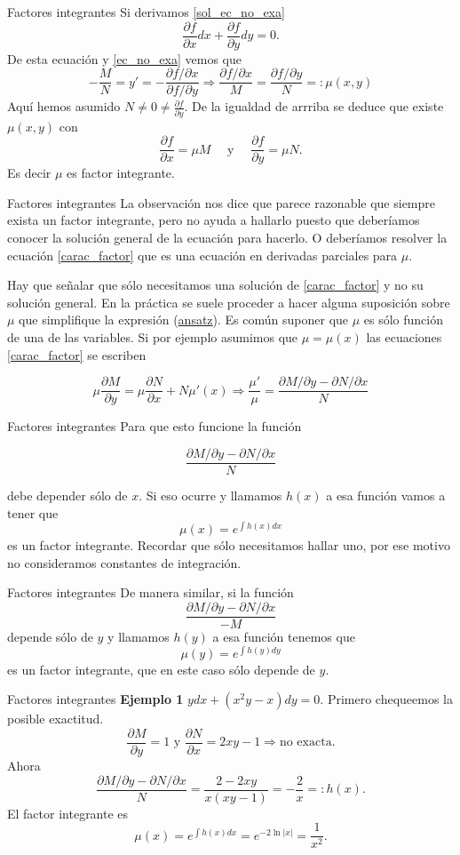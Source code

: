 \documentclass{article}
\renewcommand{\emph}[1]{\textcolor[rgb]{1,0,0}{#1}}
\newcommand{\der}[2]{\frac{\partial #1}{\partial #2}}
\begin{document}
 
 
 


{Factores integrantes}
Si derivamos \eqref{sol_ec_no_exa}
\[\der{f}{x}dx+\der{f}{y}dy=0.\]
De esta ecuación y \eqref{ec_no_exa} vemos que
\[-\frac{M}{N}=y'=-\frac{\partial f /\partial x}{\partial f/\partial y}\Longrightarrow \frac{ \partial f /\partial x}{M}=\frac{ \partial f/\partial y}{N}=:\mu(x,y)\]
Aquí hemos asumido $N\neq 0 \neq\der{f}{y}$. De la igualdad de arrriba se deduce que existe $\mu(x,y)$ con
\[\der{f}{x}=\mu M\quad\text{ y }\quad \der{f}{y}=\mu N.\]
Es decir $\mu$ es factor integrante.


{Factores integrantes}
La observación nos dice que parece razonable que siempre exista un factor integrante, pero no ayuda a hallarlo puesto que deberíamos conocer la solución general de la ecuación
para hacerlo. O deberíamos resolver la ecuación \eqref{carac_factor} que es una ecuación en derivadas parciales para $\mu$.

Hay que señalar que sólo necesitamos una solución de \eqref{carac_factor} y no su solución general. En la práctica se suele proceder a hacer alguna suposición
sobre $\mu$ que simplifique la expresión (\href{http://es.wikipedia.org/wiki/Ansatz}{ansatz}). Es común suponer que $\mu$ es sólo función de una de las variables. Si por ejemplo asumimos que $\mu=\mu(x)$ las ecuaciones 
\eqref{carac_factor} se escriben

\[\mu\der{M}{y}=\mu\der{N}{x}+N\mu'(x) \Longrightarrow\boxed{\frac{\mu'}{\mu}=\frac{\partial M/\partial y-\partial N/\partial x}{N}}\]



{Factores integrantes}
Para que esto funcione la función 

\[\frac{\partial M/\partial y-\partial N/\partial x}{N}\]

\emph{debe depender sólo de $x$}. Si eso ocurre y llamamos $h(x)$ a esa función vamos a tener que
\[\mu(x)=e^{\int h(x)dx}\]
es un factor integrante. Recordar que sólo necesitamos hallar uno, por ese motivo no consideramos constantes de integración. 


{Factores integrantes}
De manera similar, si la función
\[\frac{\partial M/\partial y-\partial N/\partial x}{-M}\]
depende sólo de $y$ y llamamos $h(y)$ a esa función tenemos que
\[\mu(y)=e^{\int h(y)dy}\]
es un factor integrante, que en este caso sólo depende de $y$.


{Factores integrantes}
\textbf{Ejemplo 1} $ydx+(x^2y-x)dy=0$.
Primero chequeemos la posible exactitud.
\[\der{M}{y}=1\text{ y } \der{N}{x}=2xy-1\Longrightarrow\text{no exacta}.\]
Ahora 
\[\frac{\partial M/\partial y-\partial N/\partial x}{N}=\frac{2-2xy}{x(xy-1)}=-\frac{2}{x}=:h(x).\]
El factor integrante es
\[\mu(x)=e^{\int h(x)dx}=e^{-2\ln |x|}=\frac{1}{x^2}.\]
\end{document}
